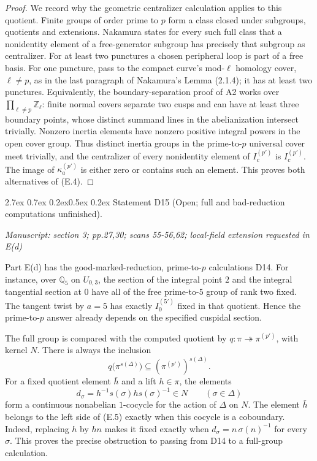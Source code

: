 \documentclass[11pt,a4paper]{article}
\makeatletter
\newcommand{\passage}[1]{\par\smallskip\noindent\textit{Manuscript: #1}\par\smallskip}
\renewcommand\paragraph{\@startsection{paragraph}{4}{\z@}%
  {2.7ex \@plus 0.7ex \@minus 0.2ex}{0.5ex \@plus 0.2ex}%
  {\normalfont\normalsize\bfseries}}
\makeatother
\begin{document}
\begin{proof}
We record why the geometric centralizer calculation applies to this
quotient.  Finite groups of order prime to $p$ form a class closed
under subgroups, quotients and extensions.  Nakamura
\cite[Lemma (2.1.2)]{Nakamura1994} states for every such full class that
a nonidentity element of a free-generator subgroup has precisely that
subgroup as centralizer.  For at least two punctures a chosen peripheral
loop is part of a free basis.  For one puncture, pass to the compact
curve's mod-$\ell$ homology cover, $\ell\ne p$, as in the last
paragraph of Nakamura's Lemma (2.1.4); it has at least two punctures.
Equivalently, the boundary-separation proof of A2 works over
$\prod_{\ell\ne p}\mathbb Z_\ell$: finite normal covers separate two
cusps and can have at least three boundary points, whose distinct
summand lines in the abelianization intersect trivially.  Nonzero
inertia elements have nonzero positive integral powers in the open
cover group.  Thus distinct inertia groups in the prime-to-$p$
universal cover meet trivially, and the centralizer of every
nonidentity element of $I_c^{(p')}$ is $I_c^{(p')}$.
The image of $\kappa_a^{(p')}$ is either zero or contains such an
element.  This proves both alternatives of (E.4).
\end{proof}

\paragraph{Statement D15 (Open; full and bad-reduction
computations unfinished).}\label{res:D15}
\passage{section 3; pp.27,30; scans 55-56,62; local-field extension requested in E(d)}

Part E(d) has the good-marked-reduction, prime-to-$p$ calculations D14.
For instance, over $\mathbb Q_5$ on $U_{0,3}$, the section of the
integral point $2$ and the integral tangential section at $0$ have all
of the free prime-to-$5$ group of rank two fixed.  The tangent twist by
$a=5$ has exactly $I_0^{(5')}$ fixed in that quotient.  Hence the
prime-to-$p$ answer already depends on the specified cuspidal section.

The full group is compared with the computed quotient by
$q:\pi\twoheadrightarrow\pi^{(p')}$, with kernel $N$.
There is always the inclusion
\[
       q\bigl(\pi^{s(\Delta)}\bigr)
                    \subseteq(\pi^{(p')})^{s(\Delta)}.          \tag{E.5}
\]
For a fixed quotient element $\bar h$ and a lift $h\in\pi$, the
elements
\[
           d_\sigma=h^{-1}s(\sigma)h s(\sigma)^{-1}\in N
                 \qquad(\sigma\in\Delta)
\]
form a continuous nonabelian $1$-cocycle for the action of $\Delta$ on
$N$.  The element $\bar h$ belongs to the left side of (E.5) exactly
when this cocycle is a coboundary.  Indeed, replacing $h$ by $hn$ makes
it fixed exactly when $d_\sigma=n\,\sigma(n)^{-1}$ for every $\sigma$.
This proves the precise obstruction to passing from D14 to a full-group
calculation.
\end{document}

